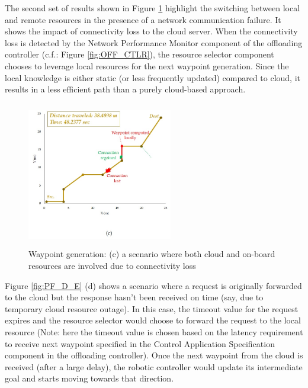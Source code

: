 The second set of results shown in Figure \ref{fig:PF_C} highlight the switching between local and remote resources in the presence of a network communication failure. It shows the impact of connectivity loss to the cloud server. When the connectivity loss is detected by the Network Performance Monitor component of the offloading controller (c.f.: Figure \ref{fig:OFF_CTLR}), the resource selector component chooses to leverage local resources for the next waypoint generation. Since the local knowledge is either static (or less frequently updated) compared to cloud, it results in a less efficient path than a purely cloud-based approach.

\begin{figure}
\includegraphics[width=2.5in,height=2.5in]{pf_c.jpg}
 \caption{Waypoint generation: (c) a scenario where both cloud and on-board resources are involved due to connectivity loss  \label{fig:PF_C}}
\end{figure}

Figure \ref{fig:PF_D_E} (d) shows a scenario where a request is originally forwarded to the cloud but the response hasn’t been received on time (say, due to temporary cloud resource outage). In this case, the timeout value for the request expires and the resource selector would choose to forward the request to the local resource (Note: here the timeout value is chosen based on the latency requirement to receive next waypoint specified in the Control Application Specification component in the offloading controller). Once the next waypoint from the cloud is received (after a large delay), the robotic controller would update its intermediate goal and starts moving towards that direction. 

